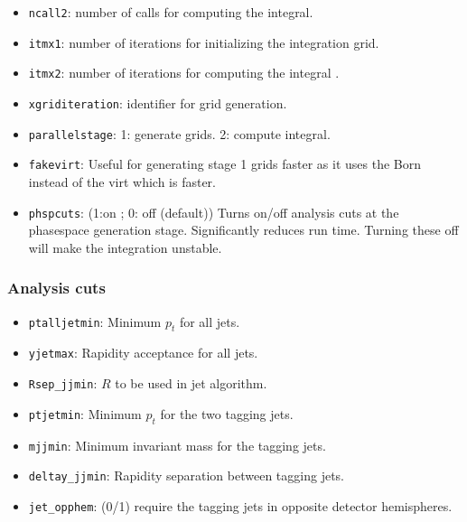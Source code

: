 \documentclass[12pt,a4]{article}
\begin{document}
\begin{itemize}
\item\texttt{ncall2}: number of calls for computing the integral.
  
\item\texttt{itmx1}: number of iterations for initializing the
  integration grid.
  
\item\texttt{itmx2}: number of iterations for computing the integral .
  
\item\texttt{xgriditeration}: identifier for grid generation.
  
\item\texttt{parallelstage}: 1: generate grids. 2: compute integral.

\item\texttt{fakevirt}: Useful for generating stage 1 grids faster as
  it uses the Born instead of the virt which is faster.

\item\texttt{phspcuts}: (1:on ; 0: off (default)) Turns on/off analysis
  cuts at the phasespace generation stage. Significantly reduces run
  time. Turning these off will make the integration unstable.
\end{itemize}

\subsubsection{Analysis cuts}
\begin{itemize}
\item\texttt{ptalljetmin}: Minimum $p_t$ for all jets.

\item\texttt{yjetmax}: Rapidity acceptance for all jets.

\item\texttt{Rsep\_jjmin}: $R$ to be used in jet algorithm.

\item\texttt{ptjetmin}: Minimum $p_t$ for the two tagging jets.

\item\texttt{mjjmin}: Minimum invariant mass for the tagging jets.

\item\texttt{deltay\_jjmin}: Rapidity separation between tagging jets.

\item\texttt{jet\_opphem}: (0/1) require the tagging jets in opposite
  detector hemispheres.
\end{itemize}
\end{document}
